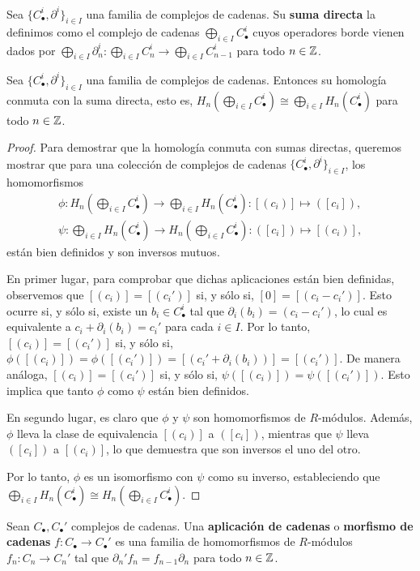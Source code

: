 \begin{definicion}
	Sea $\{C_{\bullet}^i, \partial^i\}_{i \in I}$ una familia de complejos de cadenas. Su \textbf{suma directa} la definimos como el complejo de cadenas $\bigoplus_{i \in I} C^i_{\bullet}$ cuyos operadores borde vienen dados por $\bigoplus_{i \in I} {\partial}^i_n : \bigoplus_{i \in I} C^i_n \to \bigoplus_{i \in I} C^i_{n-1}$ para todo $n \in \mathbb{Z}$.
\end{definicion}
\begin{proposicion}
	\label{prop:hom-free-commute}
	Sea $\{C_{\bullet}^i, \partial^i\}_{i \in I}$ una familia de complejos de cadenas. Entonces su homología conmuta con la suma directa, esto es, $H_n(\bigoplus_{i \in I} C_{\bullet}^i) \cong \bigoplus_{i \in I} H_n(C_{\bullet}^i)$ para todo $n \in \mathbb{Z}$.
\end{proposicion}
\begin{proof}
	Para demostrar que la homología conmuta con sumas directas, queremos mostrar que para una colección de complejos de cadenas $\{C_{\bullet}^i, \partial^i\}_{i \in I}$, los homomorfismos
	\begin{align*}
	\phi: H_n \left( \bigoplus_{i \in I} C_{\bullet}^i \right) \rightarrow \bigoplus_{i \in I} H_n (C_{\bullet}^i) : [(c_i)] \mapsto ([c_i]), \\
	\psi: \bigoplus_{i \in I} H_n (C_{\bullet}^i) \rightarrow H_n \left( \bigoplus_{i \in I} C_{\bullet}^i \right) : ([c_i]) \mapsto [(c_i)],
	\end{align*}
	están bien definidos y son inversos mutuos.
	
	En primer lugar, para comprobar que dichas aplicaciones están bien definidas, observemos que $[(c_i)] = [(c_i')]$ si, y sólo si, $[0] = [(c_i - c_i')]$. Esto ocurre si, y sólo si, existe un $b_i \in C_{\bullet}^i$ tal que $\partial_i(b_i) = (c_i - c_i')$, lo cual es equivalente a $c_i + \partial_i(b_i) = c_i'$ para cada $i \in I$. Por lo tanto, $[(c_i)] = [(c_i')]$ si, y sólo si, $\phi([(c_i)]) = \phi([(c_i')]) = [(c_i' + \partial_i(b_i))] = [(c_i')]$. De manera análoga, $[(c_i)] = [(c_i')]$ si, y sólo si, $\psi([(c_i)]) = \psi([(c_i')])$. Esto implica que tanto $\phi$ como $\psi$ están bien definidos.
	
	En segundo lugar, es claro que $\phi$ y $\psi$ son homomorfismos de $R$-módulos. Además, $\phi$ lleva la clase de equivalencia $[(c_i)]$ a $([c_i])$, mientras que $\psi$ lleva $([c_i])$ a $[(c_i)]$, lo que demuestra que son inversos el uno del otro.
	
	Por lo tanto, $\phi$ es un isomorfismo con $\psi$ como su inverso, estableciendo que $\bigoplus_{i \in I} H_n (C_{\bullet}^i) \cong H_n \left( \bigoplus_{i \in I} C_{\bullet}^i \right)$.
\end{proof}
\begin{definicion}
	Sean $C_{\bullet},C_{\bullet}'$ complejos de cadenas. Una \textbf{aplicación de cadenas} o \textbf{morfismo de cadenas} $f: C_{\bullet} \rightarrow C_{\bullet}'$ es una familia de homomorfismos de $R$-módulos $f_n: C_n \rightarrow C_n'$ tal que $\partial_n'f_n = f_{n-1}\partial_n$ para todo $n \in \mathbb{Z}$.
\end{definicion}

